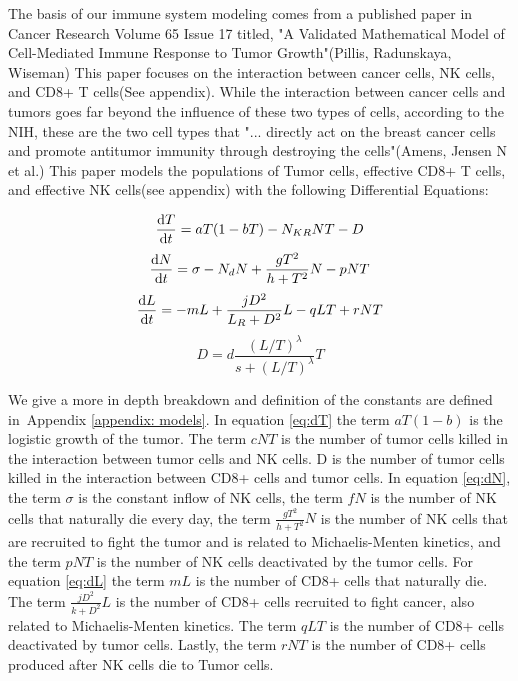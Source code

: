 \documentclass[11pt]{amsart}
\begin{document}
The basis of our immune system modeling comes from a published paper in Cancer Research Volume 65 Issue 17 titled, 
"A Validated Mathematical Model of Cell-Mediated Immune Response to Tumor Growth"(Pillis, Radunskaya, Wiseman)
This paper focuses on the interaction between cancer cells, NK cells, and CD8+ T cells(See appendix). 
While the interaction between cancer cells and tumors goes far beyond the influence of these two types of cells, 
according to the NIH, these are the two cell types that "... directly act on the breast cancer cells and promote antitumor immunity through destroying the cells"(Amens, Jensen N et al.)
This paper models the populations of Tumor cells, effective CD8+ T cells, and effective NK cells(see appendix) with the following Differential Equations:

\begin{equation} 
	\frac{\mathop{}\!\mathrm{d} T}{\mathop{}\!\mathrm{d} t} = aT(1-bT) - N_{KR}NT - D \label{eq:dT}
\end{equation}
\begin{equation} \label{eq:dN}
	\frac{\mathop{}\!\mathrm{d} N}{\mathop{}\!\mathrm{d} t} = \sigma - N_dN +\frac{gT^2}{h + T^2}N - pNT
\end{equation}
\begin{equation} \label{eq:dL}
	\frac{\mathop{}\!\mathrm{d} L}{\mathop{}\!\mathrm{d} t} = - mL +\frac{jD^2}{L_R + D^2}L - qLT + rNT
\end{equation}
\begin{equation} \label{eq: eq4}
	D = d\frac{(L/T)^\lambda}{s + (L/T)^\lambda}T
\end{equation}

We give a more in depth breakdown and definition of the constants are defined in\ Appendix \ref{appendix: models}.
In equation \eqref{eq:dT} the term $aT(1-b)$ is the logistic growth of the tumor.
The term $cNT$ is the number of tumor cells killed in the interaction between tumor cells and NK cells.
D is the number of tumor cells killed in the interaction between CD8+ cells and tumor cells.
In equation \eqref{eq:dN}, the term $\sigma$ is the constant inflow of NK cells, the term $fN$ is the number of NK cells that naturally die every day, the term $\frac{gT^2}{h + T^2}N$ is the number of NK cells that are recruited to fight the tumor and is related to Michaelis-Menten kinetics, and the term $pNT$ is the number of NK cells deactivated by the tumor cells.
For equation \eqref{eq:dL} the term $mL$ is the number of CD8+ cells that naturally die.
The term $\frac{jD^2}{k + D^2}L$ is the number of CD8+ cells recruited to fight cancer, also related to  Michaelis-Menten kinetics.
The term $qLT$ is the number of CD8+ cells deactivated by tumor cells.
Lastly, the term $rNT$ is the number of CD8+ cells produced after NK cells die to Tumor cells.
\end{document}
